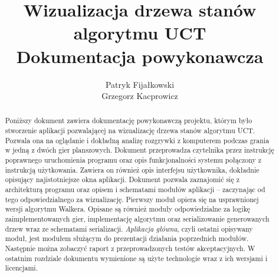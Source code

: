 \documentclass{article}
\title{
	Wizualizacja drzewa stanów algorytmu UCT \\
	\large Dokumentacja powykonawcza}
\author{Patryk Fijałkowski \\ Grzegorz Kacprowicz}
\newcommand{\modulename}[1]{\textit{#1}}
\begin{document}
\begin{titlingpage}
	\maketitle
	\vspace{3cm}
	\begin{abstract}
		Poniższy dokument zawiera dokumentację powykonawczą projektu, którym było stworzenie aplikacji pozwalającej na wizualizację drzewa stanów algorytmu UCT. Pozwala ona na oglądanie i dokładną analizę rozgrywki z komputerem podczas grania w jedną z dwóch gier planszowych. Dokument przeprowadza czytelnika przez instrukcję poprawnego uruchomienia programu oraz opis funkcjonalności systemu połączony z instrukcją użytkowania. Zawiera on również opis interfejsu użytkownika, dokładnie opisujący najistotniejsze okna aplikacji. Dokument pozwala zaznajomić się z architekturą programu oraz opisem i schematami modułów aplikacji – zaczynając od tego odpowiedzialnego za wizualizację. Pierwszy moduł opiera się na usprawnionej wersji algorytmu Walkera. Opisane są również moduły odpowiedzialne za logikę zaimplementowanych gier, implementację algorytmu oraz serializowanie generowanych drzew wraz ze schematami serializacji. \modulename{Aplikacja główna}, czyli ostatni opisywany moduł, jest modułem służącym do prezentacji działania poprzednich modułów. Następnie można zobaczyć raport z przeprowadzonych testów akceptacyjnych. W ostatnim rozdziale dokumentu wymienione są użyte technologie wraz z ich wersjami i licencjami.
	\end{abstract}
\end{titlingpage}

\begin{versionhistory}
\end{versionhistory}
\tableofcontents
	
\end{document}
